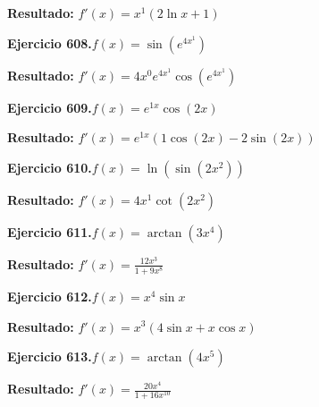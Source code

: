 \documentclass[10pt,a4paper]{article}
\begin{document}
\begin{solbox}
\textbf{Resultado:} \(\displaystyle f'(x) = x^{1}(2\ln x + 1)\)
\end{solbox}

\begin{ejbox}
\textbf{Ejercicio 608.}\quad $f(x) = \sin(e^{4x^{1}})$
\end{ejbox}

\begin{solbox}
\textbf{Resultado:} \(\displaystyle f'(x) = 4x^{0}e^{4x^{1}}\cos(e^{4x^{1}})\)
\end{solbox}

\begin{ejbox}
\textbf{Ejercicio 609.}\quad $f(x) = e^{1x} \cos(2x)$
\end{ejbox}

\begin{solbox}
\textbf{Resultado:} \(\displaystyle f'(x) = e^{1x}(1\cos(2x) - 2\sin(2x))\)
\end{solbox}

\newpage
\begin{ejbox}
\textbf{Ejercicio 610.}\quad $f(x) = \ln(\sin(2x^{2}))$
\end{ejbox}

\begin{solbox}
\textbf{Resultado:} \(\displaystyle f'(x) = 4x^{1}\cot(2x^{2})\)
\end{solbox}

\begin{ejbox}
\textbf{Ejercicio 611.}\quad $f(x) = \arctan(3x^{4})$
\end{ejbox}

\begin{solbox}
\textbf{Resultado:} \(\displaystyle f'(x) = \frac{12x^{3}}{1+9x^{8}}\)
\end{solbox}

\begin{ejbox}
\textbf{Ejercicio 612.}\quad $f(x) = x^{4} \sin x$
\end{ejbox}

\begin{solbox}
\textbf{Resultado:} \(\displaystyle f'(x) = x^{3}(4\sin x + x\cos x)\)
\end{solbox}

\newpage
\begin{ejbox}
\textbf{Ejercicio 613.}\quad $f(x) = \arctan(4x^{5})$
\end{ejbox}

\begin{solbox}
\textbf{Resultado:} \(\displaystyle f'(x) = \frac{20x^{4}}{1+16x^{10}}\)
\end{solbox}
\end{document}
